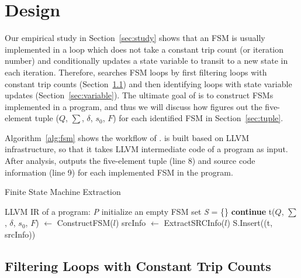 \section{\Tool{} Design}
\label{sec:impl}

Our empirical study in Section~\ref{sec:study} 
shows that an FSM is usually implemented in a loop 
which does not take a constant trip count (or iteration number) 
and conditionally updates a state variable 
to transit to a new state in each iteration. 
Therefore, \Tool{} searches FSM loops
by first filtering loops with constant trip counts (Section~\ref{sec:constant}) 
and then identifying loops with state variable updates (Section~\ref{sec:variable}).
The ultimate goal of \Tool{} is to construct FSMs implemented in a program, 
and thus we will discuss how \Tool{} figures out the five-element tuple 
($Q$, $\sum$, $\delta$, $s_0$, $F$) 
for each identified FSM in Section~\ref{sec:tuple}. 

Algorithm~\ref{alg:fsm} shows the workflow of \Tool{}.
\Tool{} is built based on LLVM infrastructure, so that 
it takes LLVM intermediate code of a program as input.  
After analysis, \Tool{} outputs the five-element tuple (line 8) 
and source code information (line 9) for each 
implemented FSM in the program.  

\begin{algorithm}[!htb]
    \caption{Finite State Machine Extraction}
    \label{alg:fsm}
    \begin{algorithmic}[1]
        \Require LLVM IR of a program: \emph{P}
        \State initialize an empty FSM set \emph{S} = \{\}
        		\State \textbf{continue}
        	\EndIf
        			\State t($Q$, $\sum$, $\delta$, $s_0$, $F$) $\gets$ ConstructFSM($l$)
        			\State srcInfo $\gets$ ExtractSRCInfo($l$) 
        			\State S.Insert((t, srcInfo))
        	\EndIf
        \EndFor
        \State {}
        \EndFunction
    \end{algorithmic}
\end{algorithm}

\subsection{Filtering Loops with Constant Trip Counts}
\label{sec:constant}

